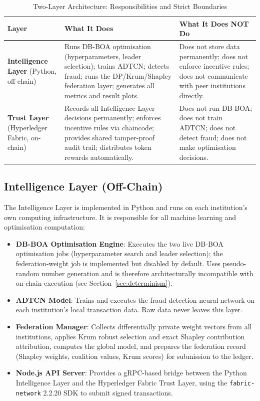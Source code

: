 \begin{table}[htbp]
\centering
\caption{Two-Layer Architecture: Responsibilities and Strict Boundaries}
\label{tab:architecture_layers}
\begin{tabular}{|p{3.0cm}|p{5.2cm}|p{5.2cm}|}
\hline
\textbf{Layer} & \textbf{What It Does} & \textbf{What It Does NOT Do} \\ \hline
\textbf{Intelligence Layer} (Python, off-chain) & Runs DB-BOA optimisation (hyperparameters, leader selection); trains ADTCN; detects fraud; runs the DP/Krum/Shapley federation layer; generates all metrics and result plots. & Does not store data permanently; does not enforce incentive rules; does not communicate with peer institutions directly. \\ \hline
\textbf{Trust Layer} (Hyperledger Fabric, on-chain) & Records all Intelligence Layer decisions permanently; enforces incentive rules via chaincode; provides shared tamper-proof audit trail; distributes token rewards automatically. & Does not run DB-BOA; does not train ADTCN; does not detect fraud; does not make optimisation decisions. \\ \hline
\end{tabular}
\end{table}

\subsection{Intelligence Layer (Off-Chain)}

The Intelligence Layer is implemented in Python and runs on each institution's own computing infrastructure. It is responsible for all machine learning and optimisation computation:

\begin{itemize}
  \item \textbf{DB-BOA Optimisation Engine}: Executes the two live DB-BOA optimisation jobs (hyperparameter search and leader selection); the federation-weight job is implemented but disabled by default. Uses pseudo-random number generation and is therefore architecturally incompatible with on-chain execution (see Section~\ref{sec:determinism}).
  \item \textbf{ADTCN Model}: Trains and executes the fraud detection neural network on each institution's local transaction data. Raw data never leaves this layer.
  \item \textbf{Federation Manager}: Collects differentially private weight vectors from all institutions, applies Krum robust selection and exact Shapley contribution attribution, computes the global model, and prepares the federation record (Shapley weights, coalition values, Krum scores) for submission to the ledger.
  \item \textbf{Node.js API Server}: Provides a gRPC-based bridge between the Python Intelligence Layer and the Hyperledger Fabric Trust Layer, using the \texttt{fabric-network} 2.2.20 SDK to submit signed transactions.
\end{itemize}

